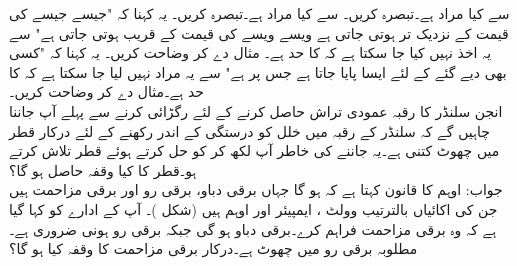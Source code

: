 سے کیا مراد ہے۔تبصرہ کریں۔
 سے کیا مراد ہے۔تبصرہ کریں۔
یہ کہنا کہ "جیسے جیسے  کی قیمت  کے نزدیک تر ہوتی جاتی ہے ویسے ویسے  کی قیمت  کے قریب ہوتی جاتی ہے" سے یہ اخذ نہیں کیا جا سکتا ہے کہ  کا حد  ہے۔ مثال دے کر وضاحت کریں۔
یہ کہنا کہ "کسی بھی دیے گئے   کے لئے ایسا  پایا جاتا ہے جس پر  ہے" سے یہ مراد نہیں لیا جا سکتا ہے کہ  کا حد  ہے۔مثال دے کر وضاحت کریں۔
\\
انجن سلنڈر  کا رقبہ عمودی تراش  حاصل کرنے کے لئے رگڑائی کرنے سے پہلے آپ جاننا چاہیں گے کہ سلنڈر کے رقبہ میں خلل کو  درستگی کے اندر رکھنے کے لئے درکار  قطر  میں چھوٹ کتنی ہے۔یہ جاننے کی خاطر آپ  لکھ کر  کو حل کرتے ہوئے قطر  تلاش کرتے ہو۔قطر کا کیا وقفہ حاصل ہو گا؟\\
جواب:\quad
{}
اوہم کا قانون کہتا ہے کہ  ہو گا جہاں  برقی دباو،  برقی رو اور  برقی مزاحمت ہیں جن کی اکائیاں بالترتیب وولٹ ، ایمپیئر  اور اوہم  ہیں (شکل )۔ آپ کے ادارے کو کہا گیا ہے کہ وہ برقی مزاحمت فراہم کرے۔برقی دباو  ہو گی جبکہ برقی رو  ہونی ضروری ہے۔ مطلوبہ برقی رو  میں چھوٹ  ہے۔درکار برقی مزاحمت کا وقفہ کیا ہو گا؟
